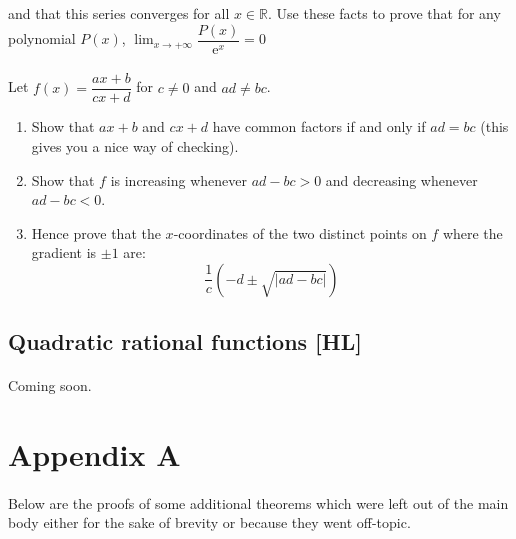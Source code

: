 \documentclass[12pt, a4paper, titlepage, twoside]{article}
\newcommand*{\R}{\mathbb{R}}
\newcommand*{\e}{\textrm{e}}
\begin{document}
	and that this series converges for all $x \in \R$. Use these facts to prove that for any polynomial $P(x)$, $\displaystyle \lim_{x \to +\infty} 
	\dfrac{P(x)}{\e^x} = 0$
	
	\paragraph{}
	Let $f(x) = \dfrac{ax+b}{cx+d}$ for $c \neq 0$ and $ad \neq bc$.
	
	\begin{enumerate}[label=\textbf{(\alph*)}]
		\item Show that $ax+b$ and $cx+d$ have common factors if and only if $ad = bc$ (this gives you a nice way of checking).
		\item Show that $f$ is increasing whenever $ad-bc > 0$ and decreasing whenever $ad-bc < 0$.
		\item Hence prove that the $x$-coordinates of the two distinct points on $f$ where the gradient is $\pm 1$ are:
		\[ \frac{1}{c}\left(-d \pm \sqrt{|ad-bc|}\right) \]
	\end{enumerate}
	
	\hfill
	
	\subsection{Quadratic rational functions [HL]}
	
	\paragraph{}
	Coming soon.
		
\newpage
	
\section{Appendix A}

	\paragraph{}
	Below are the proofs of some additional theorems which were left out of the main body either for the sake of brevity or because they
	went off-topic.\\
\end{document}
